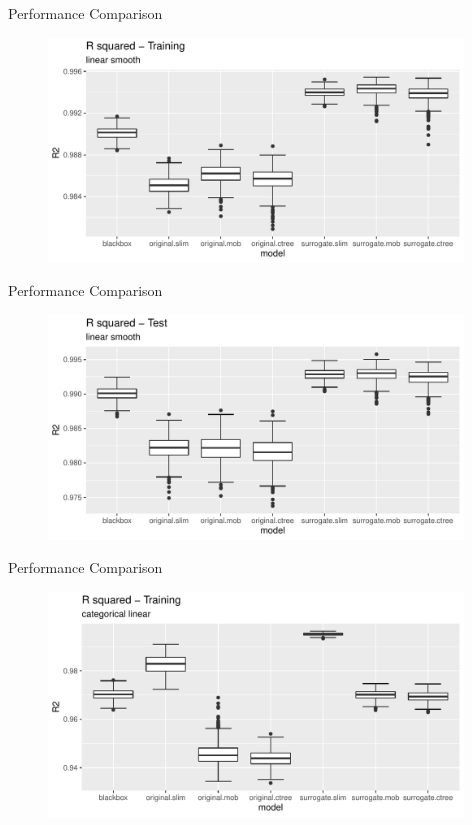 \documentclass[9pt, xcolor=table]{beamer}
\begin{document}
\begin{frame}{Performance Comparison}
\begin{figure}
    \includegraphics[width=11cm]{Figures/Performance/linear_smooth/r2_train.pdf}
\end{figure}
\end{frame}

\begin{frame}{Performance Comparison}
\begin{figure}
    \includegraphics[width=11cm]{Figures/Performance/linear_smooth/r2_test.pdf}
\end{figure}
\end{frame}

\begin{frame}{Performance Comparison}
\begin{figure}
    \includegraphics[width=11cm]{Figures/Performance/categorical_linear/r2_train.pdf}
\end{figure}
\end{frame}
\end{document}

